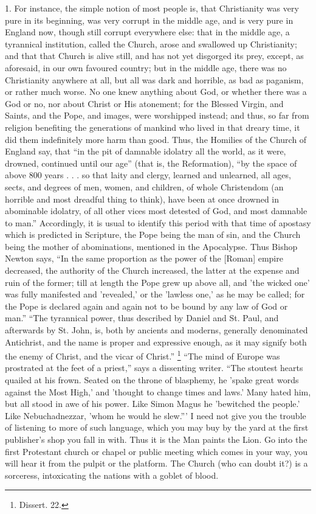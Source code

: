 1. For instance, the simple notion of most people is,
that Christianity was very pure in its beginning, was
very corrupt in the middle age, and is very pure in
England now, though still corrupt everywhere else: that
in the middle age, a tyrannical institution, called the
Church, arose and swallowed up Christianity; and that
that Church is alive still, and has not yet disgorged its
prey, except, as aforesaid, in our own favoured country;
but in the middle age, there was no Christianity anywhere
at all, but all was dark and horrible, as bad as
paganism, or rather much worse. No one knew anything
about God, or whether there was a God or no, nor about
Christ or His atonement; for the Blessed Virgin, and
Saints, and the Pope, and images, were worshipped
instead; and thus, so far from religion benefiting the
generations of mankind who lived in that dreary time, it
did them indefinitely more harm than good. Thus, the
Homilies of the Church of England say, that ``in the
pit of damnable idolatry all the world, as it were,
drowned, continued until our age'' (that is, the
Reformation), ``by the space of above 800 years . . .
so that laity and clergy, learned and unlearned, all
ages, sects, and degrees of men, women, and children, of
whole Christendom (an horrible and most dreadful thing to
think), have been at once drowned in abominable idolatry,
of all other vices most detested of God, and most
damnable to man.'' Accordingly, it is usual to
identify this period with that time of apostasy which is
predicted in Scripture, the Pope being the man of sin,
and the Church being the mother of abominations,
mentioned in the Apocalypse. Thus Bishop Newton says,
``In the same proportion as the power of the [Roman]
empire decreased, the authority of the Church increased,
the latter at the expense and ruin of the former; till at
length the Pope grew up above all, and 'the wicked one'
was fully manifested and 'revealed,' or the 'lawless
one,' as he may be called; for the Pope is declared again
and again not to be bound by any law of God or man.''
``The tyrannical power, thus described by Daniel and
St. Paul, and afterwards by St. John, is, both by
ancients and moderns, generally denominated Antichrist,
and the name is proper and expressive enough, as it may
signify both the enemy of Christ, and the vicar of
Christ.'' \footnote{Dissert. 22.} ``The mind of Europe was
prostrated at the feet of a priest,'' says a
dissenting writer. ``The stoutest hearts quailed at
his frown. Seated on the throne of blasphemy, he 'spake
great words against the Most High,' and 'thought to
change times and laws.' Many hated him, but all stood in
awe of his power. Like Simon Magus he 'bewitched the
people.' Like Nebuchadnezzar, 'whom he would he
slew.''' I need not give you the trouble of listening
to more of such language, which you may buy by the yard
at the first publisher's shop you fall in with. Thus it
is the Man paints the Lion. Go into the first Protestant
church or chapel or public meeting which comes in your
way, you will hear it from the pulpit or the platform.
The Church (who can doubt it?) is a sorceress,
intoxicating the nations with a goblet of blood.

